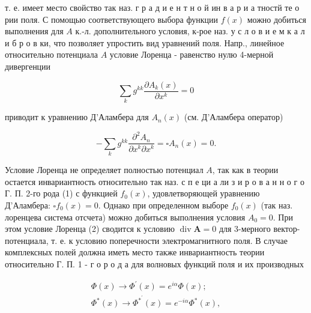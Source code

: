 \documentclass[10pt]{article}
\begin{document}
т. е. имеет место свойство так наз. г р а д и е н т н о й ин в а р и а тностй те о рии поля. С помощью соответствующего выбора функции $f(x)$ можно добиться выполнения для $A$ к.-л. дополнительного условия, к-рое наз. у с л о в и е м к а л и б р о в ки, что позволяет упростить вид уравнений поля. Напр., линейное относительно потенциала $A$ условие Лоренца - равенство нулю 4-мерной дивергенции



\[

\sum_{k} g^{k k} \frac{\partial A_{k}(x)}{\partial x^{k}}=0

\]



приводит к уравнению Д'Аламбера для $A_{n}(x)$ (см. Д'Аламбера оператор)



\[

-\sum_{k} g^{k k} \frac{\partial^{2} A_{n}}{\partial x^{k} \partial x^{k}}=\square A_{n}(x)=0 .

\]



Условие Лоренца не определяет полностью потенциал $A$, так как в теории остается инвариантность относительно так наз. с п е ци а ли з и р о в а н н о г о Г. П. 2-го рода (1) с функцией $f_{0}(x)$, удовлетворяющей уравнению Д'Аламбера: $\square f_{0}(x)=0$. Однако при определенном выборе $f_{0}(x)$ (так наз. лоренцева система отсчета) можно добиться выполнения условия $A_{0}=0$. При этом условие Лоренца (2) сводится к условию $\operatorname{div} \boldsymbol{A}=0$ для 3-мерного вектор-потенциала, т. е. к условию поперечности электромагнитного поля. В случае комплексных полей должна иметь место также инвариантность теории относительно Г. П. 1 - г о р о д а для волновых функций поля и их производных



\[

\begin{gathered}

\Phi(x) \longrightarrow \Phi^{\prime}(x)=e^{i \alpha} \Phi(x) ; \\

\Phi^{*}(x) \longrightarrow \Phi^{*^{\prime}}(x)=e^{-i \alpha} \Phi^{*}(x),

\end{gathered}

\]
\end{document}
